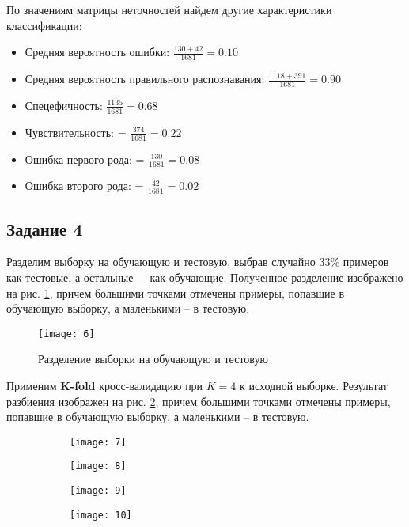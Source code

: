 По значениям матрицы неточностей найдем другие характеристики классификации:
\begin{itemize}
	\setlength\itemsep{0em}
	\item Средняя вероятность ошибки: $\frac{130+42}{1681} = 0.10$
	\item Средняя вероятность правильного распознавания: $\frac{1118+391}{1681} = 0.90$
	\item Спецефичность: $\frac{1135}{1681} = 0.68$
	\item Чувствительность: = $\frac{374}{1681} = 0.22$
	\item Ошибка первого рода: = $\frac{130}{1681} = 0.08$
	\item Ошибка второго рода: = $\frac{42}{1681} = 0.02$
\end{itemize}

\subsection{Задание 4}

Разделим выборку на обучающую и тестовую, выбрав случайно 33\% примеров как тестовые, а остальные –- как обучающие. Полученное разделение изображено на рис. \ref{fig:two_classes_train_and_test}, причем большими точками отмечены примеры, попавшие в обучающую выборку, а маленькими -- в тестовую.

\begin{figure}[H]
\begin{center}
	\texttt{[image: 6]}
	\caption{Разделение выборки на обучающую и тестовую}
	\label{fig:two_classes_train_and_test}
\end{center}
\end{figure}

\newpage

Применим \textbf{K-fold} кросс-валидацию при $K=4$ к исходной выборке. Результат разбиения изображен на рис. \ref{fig:two_classes_kfold}, причем большими точками отмечены примеры, попавшие в обучающую выборку, а маленькими -- в тестовую.

\begin{figure}[H]
\begin{center}
	\begin{subfigure}[b]{0.49\textwidth}
		\texttt{[image: 7]}
	\end{subfigure}
	\begin{subfigure}[b]{0.49\textwidth}
		\texttt{[image: 8]}
	\end{subfigure}
	\begin{subfigure}[b]{0.49\textwidth}
		\texttt{[image: 9]}
	\end{subfigure}
	\begin{subfigure}[b]{0.49\textwidth}
		\texttt{[image: 10]}
	\end{subfigure}
	\caption{}
	\label{fig:two_classes_kfold}
\end{center}
\end{figure}

